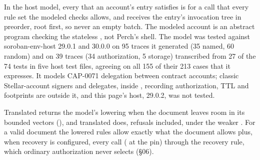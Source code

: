\begin{statement}\label{stmt:authorization-tree-coverage}
In the host model, every  that an account's entry satisfies is for a call that every rule set the modeled  checks allows, and  receives the entry's invocation tree in preorder, root first, so never an empty batch. The modeled account is an abstract program checking the stateless , not Perch's shell. The model was tested against soroban-env-host 29.0.1 and 30.0.0 on 95 traces it generated (35 named, 60 random) and on 39 traces (34 authorization, 5 storage) transcribed from 27 of the 74 tests in five host test files, agreeing on all 155 of their 213 cases that it expresses. It models CAP-0071 delegation between contract accounts; classic Stellar-account signers and delegates,  inside , recording authorization, TTL and footprints are outside it, and this page's host, 29.0.2, was not tested.
\end{statement}
\begin{statement}\label{stmt:lowering-equivalence}
Translated  returns the model's lowering when the document leaves room in its bounded vectors (), and translated  does, refusals included, under the weaker . For a valid document the lowered rules allow exactly what the document allows plus, when recovery is configured, every  call ( at the pin) through the recovery rule, which ordinary authorization never selects (\S{}06).
\end{statement}
